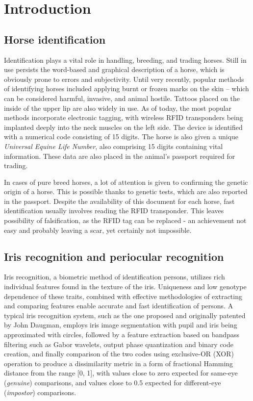 \documentclass[10pt,twocolumn,letterpaper]{article}
\begin{document}
\section{Introduction}
\label{sec:Intro}
\subsection{Horse identification}
Identification plays a vital role in handling, breeding, and trading horses. Still in use persists the word-based and graphical description of a horse, which is obviously prone to errors and subjectivity. Until very recently, popular methods of identifying horses included applying burnt or frozen marks on the skin -- which can be considered harmful, invasive, and animal hostile. Tattoos placed on the inside of the upper lip are also widely in use. As of today, the most popular methods incorporate electronic tagging, with wireless RFID transponders being implanted deeply into the neck muscles on the left side. The device is identified with a numerical code consisting of 15 digits. The horse is also given a unique \emph{Universal Equine Life Number}, also comprising 15 digits containing vital information. These data are also placed in the animal's passport required for trading. 

In cases of pure breed horses, a lot of attention is given to confirming the genetic origin of a horse. This is possible thanks to genetic tests, which are also reported in the passport. Despite the availability of this document for each horse, fast identification usually involves reading the RFID transponder. This leaves possibility of falsification, as the RFID tag can be replaced - an achievement not easy and probably leaving a scar, yet certainly not impossible.

\subsection{Iris recognition and periocular recognition}
Iris recognition, a biometric method of identification persons, utilizes rich individual features found in the texture of the iris. Uniqueness and low genotype dependence of these traits, combined with effective methodologies of extracting and comparing features enable accurate and fast identification of persons. A typical iris recognition system, such as the one proposed \cite{Daugman1993} and originally patented \cite{DaugmanPatent} by John Daugman, employs iris image segmentation with pupil and iris being approximated with circles, followed by a feature extraction based on bandpass filtering such as Gabor wavelets, output phase quantization and binary code creation, and finally comparison of the two codes using exclusive-OR (XOR) operation to produce a dissimilarity metric in a form of fractional Hamming distance from the range [0, 1], with values close to zero expected for same-eye (\emph{genuine}) comparisons, and values close to 0.5 expected for different-eye (\emph{impostor}) comparisons. 
\end{document}
